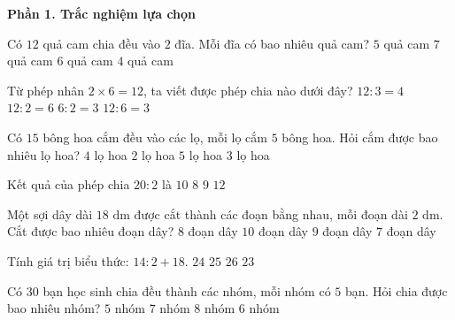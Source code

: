 \textbf{Phần 1. Trắc nghiệm lựa chọn}

\begin{ex} %
Có $12$ quả cam chia đều vào $2$ đĩa. Mỗi đĩa có bao nhiêu quả cam?
\choice
{$5$ quả cam}
{$7$ quả cam}
{\True $6$ quả cam}
{$4$ quả cam}
\end{ex}

\begin{ex} %
Từ phép nhân $2 \times 6 = 12$, ta viết được phép chia nào dưới đây?
\choice
{$12 : 3 = 4$}
{\True $12 : 2 = 6$}
{$6 : 2 = 3$}
{$12 : 6 = 3$}
\end{ex}

\begin{ex} %
Có $15$ bông hoa cắm đều vào các lọ, mỗi lọ cắm $5$ bông hoa. Hỏi cắm được bao nhiêu lọ hoa?
\choice
{$4$ lọ hoa}
{$2$ lọ hoa}
{$5$ lọ hoa}
{\True $3$ lọ hoa}
\end{ex}

\begin{ex} %
Kết quả của phép chia $20 : 2$ là
\choice
{\True $10$}
{$8$}
{$9$}
{$12$}
\end{ex}

\begin{ex} %
Một sợi dây dài $18\text{ dm}$ được cắt thành các đoạn bằng nhau, mỗi đoạn dài $2\text{ dm}$. Cắt được bao nhiêu đoạn dây?
\choice
{$8$ đoạn dây}
{$10$ đoạn dây}
{\True $9$ đoạn dây}
{$7$ đoạn dây}
\end{ex}

\begin{ex} %
Tính giá trị biểu thức: $14 : 2 + 18$.
\choice
{$24$}
{\True $25$}
{$26$}
{$23$}
\end{ex}

\begin{ex} %
Có $30$ bạn học sinh chia đều thành các nhóm, mỗi nhóm có $5$ bạn. Hỏi chia được bao nhiêu nhóm?
\choice
{$5$ nhóm}
{$7$ nhóm}
{$8$ nhóm}
{\True $6$ nhóm}
\end{ex}

